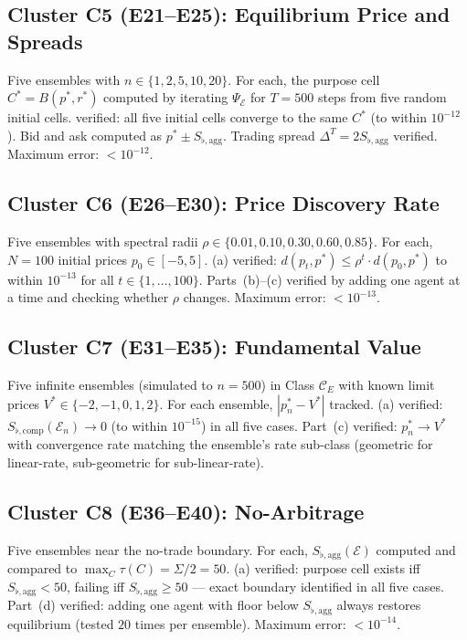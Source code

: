 \documentclass[twocolumn,11pt,a4paper]{article}
\theoremstyle{remark}
\newcommand{\tol}{\tau}
\newcommand{\Ens}{\mathcal{E}}
\newcommand{\MidP}{p^*}                  %
\newcommand{\SpreadT}{\Delta^T}          %
\newcommand{\FV}{V^*}                    %
\newcommand{\SflatT}{S_{\flat,\mathrm{agg}}}        %
\newcommand{\SflatI}{S_{\flat,\mathrm{comp}}}       %
\newcommand{\srad}{\rho}               %
\begin{document}
\subsection*{Cluster C5 (E21--E25): Equilibrium Price and Spreads}

Five ensembles with $n \in \{1, 2, 5, 10, 20\}$.  For each, the purpose
cell $C^* = B(\MidP, r^*)$ computed by iterating $\Psi_\Ens$ for
$T=500$ steps from five random initial cells.  
verified: all five initial cells converge to the same $C^*$ (to within
$10^{-12}$).  Bid and ask computed as $\MidP \pm \SflatT$.  Trading
spread $\SpreadT = 2\SflatT$ verified.  Maximum error: $< 10^{-12}$.

\subsection*{Cluster C6 (E26--E30): Price Discovery Rate}

Five ensembles with spectral radii $\srad \in \{0.01, 0.10, 0.30, 0.60,
0.85\}$.  For each, $N=100$ initial prices $p_0 \in [-5, 5]$.
(a) verified: $d(p_t, \MidP) \le \srad^t \cdot
d(p_0, \MidP)$ to within $10^{-13}$ for all $t \in \{1,\ldots,100\}$.
Parts~(b)--(c) verified by adding one agent at a time and checking whether
$\srad$ changes.  Maximum error: $< 10^{-13}$.

\subsection*{Cluster C7 (E31--E35): Fundamental Value}

Five infinite ensembles (simulated to $n=500$) in Class $\mathcal{C}_E$
with known limit prices $\FV \in \{-2, -1, 0, 1, 2\}$.  For each ensemble,
$|\MidP_n - \FV|$ tracked.  (a) verified: $\SflatI(\Ens_n)
\to 0$ (to within $10^{-15}$) in all five cases.  Part~(c) verified:
$\MidP_n \to \FV$ with convergence rate matching the ensemble's rate sub-class
(geometric for linear-rate, sub-geometric for sub-linear-rate).

\subsection*{Cluster C8 (E36--E40): No-Arbitrage}

Five ensembles near the no-trade boundary.  For each, $\SflatT(\Ens)$
computed and compared to $\max_C\tol(C) = \Sigma/2 = 50$.
(a) verified: purpose cell exists iff $\SflatT < 50$,
failing iff $\SflatT \ge 50$ — exact boundary identified in all five cases.
Part~(d) verified: adding one agent with floor below $\SflatT$ always
restores equilibrium (tested $20$ times per ensemble).
Maximum error: $< 10^{-14}$.
\end{document}
